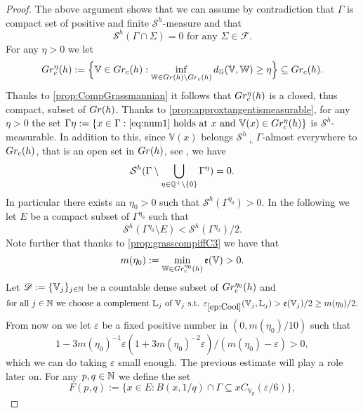 \documentclass[10pt, a4paper,
oneside, headinclude,footinclude]{scrartcl}
\begin{document}
\begin{proof}
The above argument shows that we can assume by contradiction that $\Gamma$ is compact set of positive and finite $\mathcal{S}^h$-measure and that 
\begin{equation}
    \mathcal{S}^h(\Gamma\cap \Sigma)=0\text{ for any }\Sigma\in\mathscr{F}.
    \label{eq:gammaunrect}
\end{equation}
For any $\eta>0$ we let
$$
Gr_c^\eta(h):=\Big\{\mathbb{V}\in Gr_c(h):\inf_{\mathbb{W}\in Gr(h)\setminus Gr_c(h)}d_\mathbb{G}(\mathbb{V},\mathbb{W})\geq \eta\Big\}\subseteq Gr_c(h).
$$
Thanks to \cref{prop:CompGrassmannian} it follows that $Gr_c^\eta(h)$ is a closed, thus compact, subset of $Gr(h)$.
Thanks to \cref{prop:approxtangentismeasurable}, for any $\eta>0$ the set $\Gamma\eta:=\{x\in\Gamma:\eqref{eq:num1}\text{ holds at $x$ and } \mathbb{V}(x)\in Gr_c^\eta(h)\}$ is $\mathcal{S}^h$-measurable. In addition to this, since $\mathbb{V}(x)$ belongs $\mathcal{S}^h\llcorner \Gamma$-almost everywhere to $Gr_c(h)$, that is an open set in $Gr(h)$, see \cite[Proposition 2.17]{antonelli2020rectifiable}, we have
$$\mathcal{S}^h(\Gamma\setminus \bigcup_{\eta\in\mathbb{Q}^+\setminus\{0\}}\Gamma^\eta)=0.$$
In particular there exists an $\eta_0>0$ such that $\mathcal{S}^h(\Gamma^{\eta_0})>0$.
In the following we let $E$ be a compact subset of $\Gamma^{\eta_0}$ such that 
$$
\mathcal{S}^h(\Gamma^{\eta_0}\setminus E)<\mathcal{S}^h(\Gamma^{\eta_0})/2.
$$
Note further that thanks to \cref{prop:grasscompiffC3} we have that
$$m(\eta_0):=\min_{\mathbb{W}\in Gr_c^{\eta_0}(h)}\mathfrak{e}(\mathbb{V})>0.$$
Let
$\mathscr{D}:=\{\mathbb V_{j}\}_{j\in\mathbb{N}}$
 be a countable dense subset of $Gr_c^{\eta_0}(h)$ and
 \begin{equation}\nonumber
     \text{for all $j\in\N$ we choose a complement $\mathbb L_{j}$ of $\mathbb V_{j}$ s.t. $\oldep{ep:Cool}(\mathbb V_{j},\mathbb L_{j})>\mathfrak{e}(\mathbb{V}_j)/2\geq m(\eta_0)/2$}.
 \end{equation}
From now on we let $\varepsilon$ be a fixed positive number in $(0,m(\eta_0)/10)$ such that 
\begin{equation}\label{eqn:BoundStr}
    1-3m(\eta_0)^{-1}\varepsilon(1+3 m(\eta_0)^{-2}\varepsilon)/(m(\eta_0)-\varepsilon)>0,
\end{equation}
which we can do taking $\varepsilon$ small enough. The previous estimate will play a role later on. For any $p,q\in\mathbb{N}$ we define the set
\begin{equation}
    F(p,q):=\{x\in E: B(x,1/q)\cap \Gamma\subseteq xC_{\mathbb{V}_p}(\varepsilon/6)
\},
\end{equation}

\end{proof}
\end{document}
